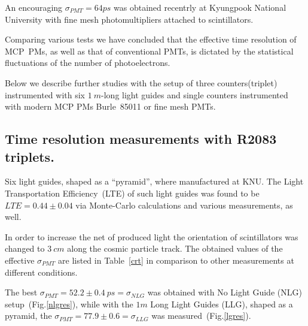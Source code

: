 An encouraging $\sigma_{PMT}=64 ps$ was obtained recentrly at Kyungpook National University\cite{kuznetsov}
 with fine mesh photomultipliers attached to scintillators.


Comparing  various  tests we have concluded that the effective time resolution of MCP~PMs,
as well as that of conventional PMTs,
is  dictated   by the statistical fluctuations  of the number of photoelectrons.


Below we describe   further studies 
with  the setup of three counters(triplet)  
instrumented with six  $1~m$-long light guides\cite{llg} and single counters 
instrumented with  modern MCP PMs Burle~85011  or fine mesh PMTs.







\subsection{Time resolution measurements with R2083 triplets.}
Six light guides, shaped as a ``pyramid'', where manufactured at KNU. 
The Light Transportation Efficiency~(LTE) of 
such light guides was found to be $LTE=0.44\pm0.04$ via  
Monte-Carlo  calculations\cite{mutch} and  various measurements\cite{llg}, as well.

In order to increase the net of produced light the 
orientation of scintillators was changed to $3~cm$ along the cosmic particle track.
The   obtained  values of the effective $\sigma_{PMT}$
are listed in Table~\ref{crt} in comparison to other measurements  at  different conditions. 

The best  $\sigma_{PMT}=52.2\pm0.4 ~ps=\sigma_{NLG}$ was obtained 
 with No Light Guide (NLG)
setup~(Fig.\ref{nlgres}), while
with the  $1m$ Long Light Guides (LLG), shaped as a  pyramid, 
the $\sigma_{PMT}=77.9\pm0.6=\sigma_{LLG}$
was measured~(Fig.\ref{lgres}). 

